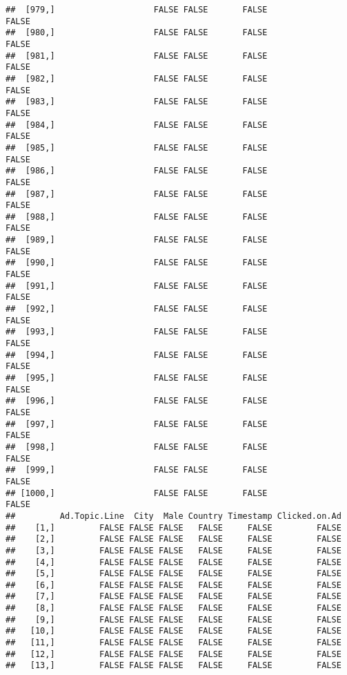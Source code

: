 \documentclass[
]{article}
\begin{document}
\begin{verbatim}
##  [979,]                    FALSE FALSE       FALSE                FALSE
##  [980,]                    FALSE FALSE       FALSE                FALSE
##  [981,]                    FALSE FALSE       FALSE                FALSE
##  [982,]                    FALSE FALSE       FALSE                FALSE
##  [983,]                    FALSE FALSE       FALSE                FALSE
##  [984,]                    FALSE FALSE       FALSE                FALSE
##  [985,]                    FALSE FALSE       FALSE                FALSE
##  [986,]                    FALSE FALSE       FALSE                FALSE
##  [987,]                    FALSE FALSE       FALSE                FALSE
##  [988,]                    FALSE FALSE       FALSE                FALSE
##  [989,]                    FALSE FALSE       FALSE                FALSE
##  [990,]                    FALSE FALSE       FALSE                FALSE
##  [991,]                    FALSE FALSE       FALSE                FALSE
##  [992,]                    FALSE FALSE       FALSE                FALSE
##  [993,]                    FALSE FALSE       FALSE                FALSE
##  [994,]                    FALSE FALSE       FALSE                FALSE
##  [995,]                    FALSE FALSE       FALSE                FALSE
##  [996,]                    FALSE FALSE       FALSE                FALSE
##  [997,]                    FALSE FALSE       FALSE                FALSE
##  [998,]                    FALSE FALSE       FALSE                FALSE
##  [999,]                    FALSE FALSE       FALSE                FALSE
## [1000,]                    FALSE FALSE       FALSE                FALSE
##         Ad.Topic.Line  City  Male Country Timestamp Clicked.on.Ad
##    [1,]         FALSE FALSE FALSE   FALSE     FALSE         FALSE
##    [2,]         FALSE FALSE FALSE   FALSE     FALSE         FALSE
##    [3,]         FALSE FALSE FALSE   FALSE     FALSE         FALSE
##    [4,]         FALSE FALSE FALSE   FALSE     FALSE         FALSE
##    [5,]         FALSE FALSE FALSE   FALSE     FALSE         FALSE
##    [6,]         FALSE FALSE FALSE   FALSE     FALSE         FALSE
##    [7,]         FALSE FALSE FALSE   FALSE     FALSE         FALSE
##    [8,]         FALSE FALSE FALSE   FALSE     FALSE         FALSE
##    [9,]         FALSE FALSE FALSE   FALSE     FALSE         FALSE
##   [10,]         FALSE FALSE FALSE   FALSE     FALSE         FALSE
##   [11,]         FALSE FALSE FALSE   FALSE     FALSE         FALSE
##   [12,]         FALSE FALSE FALSE   FALSE     FALSE         FALSE
##   [13,]         FALSE FALSE FALSE   FALSE     FALSE         FALSE

\end{verbatim}
\end{document}
